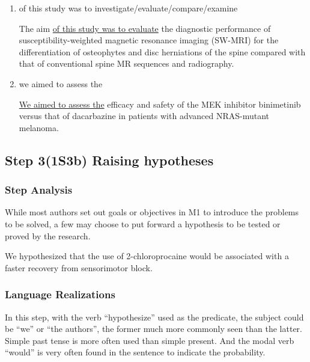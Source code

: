 \documentclass[a4paper]{ctexbook}
\begin{document}
\begin{enumerate}
      \item of this study was to investigate/evaluate/compare/examine
      \begin{eg}{}
        The aim \uline{of this study was to evaluate} the diagnostic performance of susceptibility-weighted magnetic resonance imaging (SW-MRI) for the differentiation of osteophytes and disc herniations of the spine compared with that of conventional spine MR sequences and radiography.
      \end{eg}

      \item we aimed to assess the
      \begin{eg}{}
        \uline{We aimed to assess the} efficacy and safety of the MEK inhibitor binimetinib versus that of dacarbazine in patients with advanced NRAS-mutant melanoma.
      \end{eg}

    \end{enumerate}

  \subsection{Step 3(1S3b) Raising hypotheses}
    
    \subsubsection{Step Analysis}

    While most authors set out goals or objectives in M1 to introduce the problems to be solved, a few may choose to put forward a hypothesis to be tested or proved by the research.

    \begin{eg}{}
      We hypothesized that the use of 2-chloroprocaine would be associated with a faster recovery from sensorimotor block.
    \end{eg}

    \subsubsection{Language Realizations}

    In this step, with the verb ``hypothesize'' used as the predicate, the subject could be ``we'' or ``the authors'', the former much more commonly seen than the latter. Simple past tense is more often used than simple present. And the modal verb ``would'' is very often found in the sentence to indicate the probability.
\end{document}
